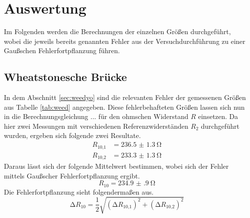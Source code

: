 \section{Auswertung}
Im Folgenden werden die Berechnungen der einzelnen Größen durchgeführt, wobei die jeweils bereits genannten Fehler aus der Versuchdurchführung zu einer
Gaußschen Fehlerfortpflanzung führen. 

\subsection{Wheatstonesche Brücke}
In dem Abschnitt \ref{sec:weedyo} sind die relevanten Fehler der gemessenen Größen aus Tabelle \ref{tab:weed} angegeben. Diese fehlerbehafteten Größen lassen sich nun in die Berechnungsgleichung ...
für den ohmschen Widerstand $R$ einsetzen.
Da hier zwei Messungen mit verschiedenen Referenzwiderständen $R_{2}$ durchgeführt wurden, ergeben sich folgende zwei Resultate.
\begin{align}
R_{10\text{,}1} &= \SI{236.5(13)}{\ohm} \\
R_{10\text{,}2} &= \SI{233.3(13)}{\ohm} 
\end{align}
Daraus lässt sich der folgende Mittelwert bestimmen, wobei sich der Fehler mittels Gaußscher Fehlerfortpflanzung ergibt.
\begin{equation}
R_{10} = \SI{234.9(9)}{\ohm}
\end{equation}
Die Fehlerfortpflanzung sieht folgendermaßen aus.
\begin{equation}
\increment R_{10} = \frac{1}{2} \sqrt{(\increment R_{10\text{,}1})^{2} + (\increment R_{10\text{,}2})^{2} }
\end{equation}